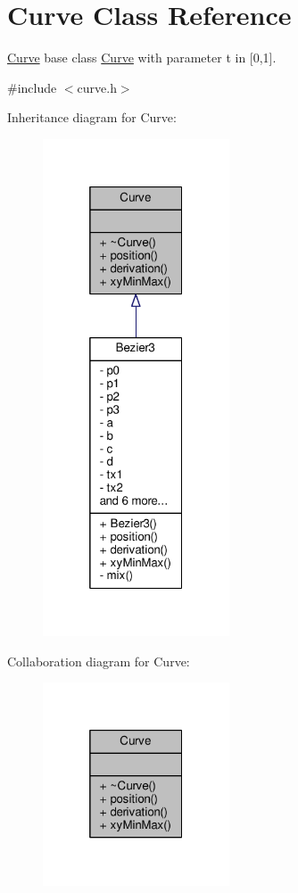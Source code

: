 \hypertarget{classCurve}{}\section{Curve Class Reference}
\label{classCurve}


\hyperlink{classCurve}{Curve} base class \hyperlink{classCurve}{Curve} with parameter t in \mbox{[}0,1\mbox{]}.  




{\ttfamily \#include $<$curve.\+h$>$}



Inheritance diagram for Curve\+:\nopagebreak
\begin{figure}[H]
\begin{center}
\leavevmode
\includegraphics[width=157pt]{classCurve__inherit__graph}
\end{center}
\end{figure}


Collaboration diagram for Curve\+:\nopagebreak
\begin{figure}[H]
\begin{center}
\leavevmode
\includegraphics[width=157pt]{classCurve__coll__graph}
\end{center}
\end{figure}
